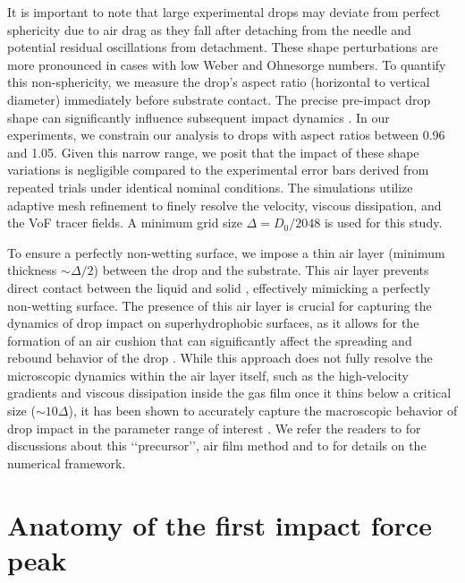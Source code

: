 \documentclass{jfm}
\begin{document}
	It is important to note that large experimental drops may deviate from perfect sphericity due to air drag as they fall after detaching from the needle and potential residual oscillations from detachment. These shape perturbations are more pronounced in cases with low Weber and Ohnesorge numbers. To quantify this non-sphericity, we measure the drop's aspect ratio (horizontal to vertical diameter) immediately before substrate contact. The precise pre-impact drop shape can significantly influence subsequent impact dynamics \citep{thoraval-2013-jfm, yun2017bouncing,Zhang2019}. In our experiments, we constrain our analysis to drops with aspect ratios between 0.96 and 1.05. Given this narrow range, we posit that the impact of these shape variations is negligible compared to the experimental error bars derived from repeated trials under identical nominal conditions.
	The simulations utilize adaptive mesh refinement to finely resolve the velocity, viscous dissipation, and the VoF tracer fields. A minimum grid size $\Delta = D_0/2048$ is used for this study. 
	
	To ensure a perfectly non-wetting surface, we impose a thin air layer (minimum thickness $\sim \Delta/2$) between the drop and the substrate. This air layer prevents direct contact between the liquid and solid \citep{kolinski-2014-epl, sprittles2024gas}, effectively mimicking a perfectly non-wetting surface. The presence of this air layer is crucial for capturing the dynamics of drop impact on superhydrophobic surfaces, as it allows for the formation of an air cushion that can significantly affect the spreading and rebound behavior of the drop \citep{ramirez2020lifting, sanjay_chantelot_lohse_2023}.
	While this approach does not fully resolve the microscopic dynamics within the air layer itself, such as the high-velocity gradients and viscous dissipation inside the gas film once it thins below a critical size ($\sim 10\Delta$), it has been shown to accurately capture the macroscopic behavior of drop impact in the parameter range of interest \citep{ramirez2020lifting, sanjay2023drop, alventosa2023inertio, garcia2024skating}. We refer the readers to \citet{VatsalThesis} for discussions about this \lq\lq precursor\rq\rq, air film method and to \citet{popinet-basilisk, basiliskVatsal, zhang2022impact} for details on the numerical framework.
	
	\section{Anatomy of the first impact force peak}\label{sec:FirstPeak}
	
\end{document}
